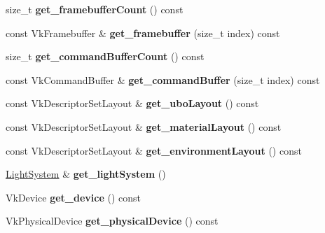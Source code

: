 \begin{Indent}
\begin{DoxyCompactItemize}
size\+\_\+t {\bfseries get\+\_\+framebuffer\+Count} () const
\item 
\mbox{\label{classblaze_1_1ForwardRenderer_a269ca18ba0efb64bb895a9c179a9c4e0}} 
const Vk\+Framebuffer \& {\bfseries get\+\_\+framebuffer} (size\+\_\+t index) const
\item 
\mbox{\label{classblaze_1_1ForwardRenderer_a39079fb0955406b7d080a8768a518d82}} 
size\+\_\+t {\bfseries get\+\_\+command\+Buffer\+Count} () const
\item 
\mbox{\label{classblaze_1_1ForwardRenderer_ae55781002a3ab027efc89513559bd848}} 
const Vk\+Command\+Buffer \& {\bfseries get\+\_\+command\+Buffer} (size\+\_\+t index) const
\item 
\mbox{\label{classblaze_1_1ForwardRenderer_a81ce45e3acc00ec286bfa2fa17d0bc4a}} 
const Vk\+Descriptor\+Set\+Layout \& {\bfseries get\+\_\+ubo\+Layout} () const
\item 
\mbox{\label{classblaze_1_1ForwardRenderer_af15b7613cd44e32ef27128766eaa5fc5}} 
const Vk\+Descriptor\+Set\+Layout \& {\bfseries get\+\_\+material\+Layout} () const
\item 
\mbox{\label{classblaze_1_1ForwardRenderer_a76cad25fcb3b9f08e0fa257c9f2b9e94}} 
const Vk\+Descriptor\+Set\+Layout \& {\bfseries get\+\_\+environment\+Layout} () const
\item 
\mbox{\label{classblaze_1_1ForwardRenderer_a68211e939eaba2537bc51df33cc35823}} 
\hyperlink{classblaze_1_1LightSystem}{Light\+System} \& {\bfseries get\+\_\+light\+System} ()
\item 
\mbox{\label{classblaze_1_1ForwardRenderer_a9dab699dc44eb3b2fb21fe4d1c55f04b}} 
Vk\+Device {\bfseries get\+\_\+device} () const
\item 
\mbox{\label{classblaze_1_1ForwardRenderer_ad650c175a5b4d01fbae664dc7923fba2}} 
Vk\+Physical\+Device {\bfseries get\+\_\+physical\+Device} () const
\item 

\end{DoxyCompactItemize}
\end{Indent}
